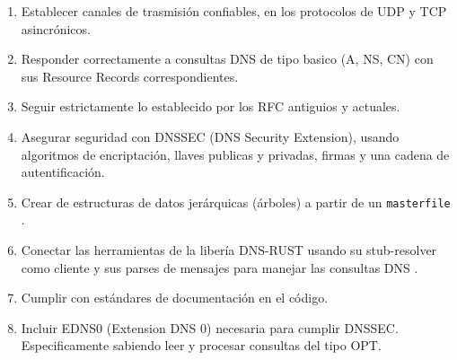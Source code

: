 \begin{enumerate}
\item Establecer canales de trasmisión confiables, en los protocolos de UDP y TCP asincrónicos.
\item Responder correctamente a consultas DNS de tipo basico (A, NS, CN) con sus Resource Records correspondientes.
\item Seguir estrictamente lo establecido por los RFC antiguios y actuales.
\item Asegurar seguridad con DNSSEC (DNS Security Extension), usando algoritmos de encriptación, llaves publicas y privadas, firmas y una cadena de autentificación.
\item Crear de estructuras de datos jerárquicas (árboles) a partir de un \texttt{masterfile} .
\item Conectar las herramientas de la libería DNS-RUST usando su stub-resolver como cliente y sus parses de mensajes para manejar las consultas DNS .
\item Cumplir con estándares de documentación en el código.
\item Incluir EDNS0 (Extension DNS 0) necesaria para cumplir DNSSEC. Especificamente sabiendo leer y procesar consultas del tipo OPT.


\end{enumerate}


